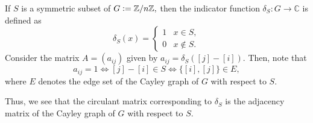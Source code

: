 \begin{ex}
    If $S$ is a symmetric subset of $G \vcentcolon= \mathbb{Z}/n\mathbb{Z},$ then the indicator function $\delta_S : G \to \mathbb{C}$ is defined as
    \begin{equation*} 
        \delta_S(x) = \begin{cases}
            1 & x \in S,\\
            0 & x \notin S. 
        \end{cases}
    \end{equation*} 
    Consider the matrix $A = (a_{ij})$ given by $a_{ij} = \delta_{S}([j] - [i]).$ Then, note that 
    \begin{equation*} 
        a_{ij} = 1 \iff [j] - [i] \in S \iff \{[i], [j]\} \in E,
    \end{equation*}
    where $E$ denotes the edge set of the Cayley graph of $G$ with respect to $S.$

    Thus, we see that the circulant matrix corresponding to $\delta_S$ is the adjacency matrix of the Cayley graph of $G$ with respect to $S.$
\end{ex}


